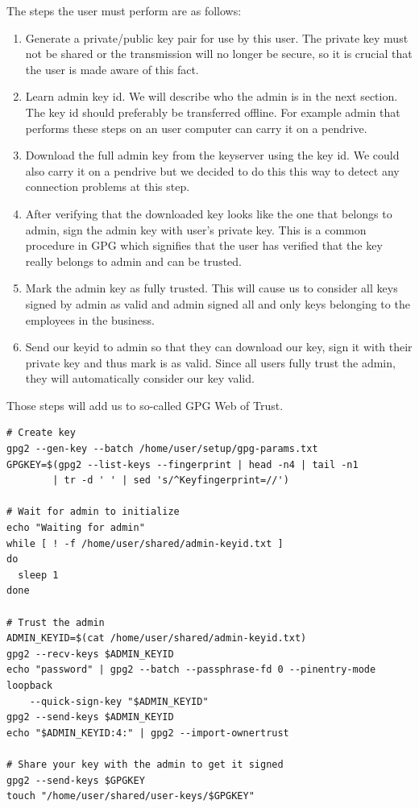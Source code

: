 \documentclass{classrep}
\begin{document}
The steps the user must perform are as follows:

\begin{enumerate}
\item Generate a private/public key pair for use by this user. The private key must not be shared
    or the transmission will no longer be secure, so it is crucial that the user is made aware of
    this fact.
\item Learn admin key id. We will describe who the admin is in the next section. The key id should
    preferably be transferred offline. For example admin that performs these steps on an user
    computer can carry it on a pendrive.
\item Download the full admin key from the keyserver using the key id.  We could also carry it on
    a pendrive but we decided to do this this way to detect any connection problems at this step.
\item After verifying that the downloaded key looks like the one that belongs to admin, sign the
    admin key with user's private key. This is a common procedure in GPG which signifies
    that the user has verified that the key really belongs to admin and can be trusted.
\item Mark the admin key as fully trusted. This will cause us to consider all keys signed
    by admin as valid and admin signed all and only keys belonging to the employees 
    in the business.
\item Send our keyid to admin so that they can download our key, sign it with their private key
    and thus mark is as valid. Since all users fully trust the admin, they will automatically
    consider our key valid. 
\end{enumerate}

Those steps will add us to so-called GPG Web of Trust.

\begin{lstlisting}[label={lst:setup-user-init}, caption={Script run by user.}]
# Create key
gpg2 --gen-key --batch /home/user/setup/gpg-params.txt
GPGKEY=$(gpg2 --list-keys --fingerprint | head -n4 | tail -n1 
        | tr -d ' ' | sed 's/^Keyfingerprint=//')

# Wait for admin to initialize
echo "Waiting for admin"
while [ ! -f /home/user/shared/admin-keyid.txt ]
do
  sleep 1
done

# Trust the admin
ADMIN_KEYID=$(cat /home/user/shared/admin-keyid.txt)
gpg2 --recv-keys $ADMIN_KEYID
echo "password" | gpg2 --batch --passphrase-fd 0 --pinentry-mode loopback 
    --quick-sign-key "$ADMIN_KEYID"
gpg2 --send-keys $ADMIN_KEYID
echo "$ADMIN_KEYID:4:" | gpg2 --import-ownertrust

# Share your key with the admin to get it signed
gpg2 --send-keys $GPGKEY
touch "/home/user/shared/user-keys/$GPGKEY"
\end{lstlisting}
\end{document}
